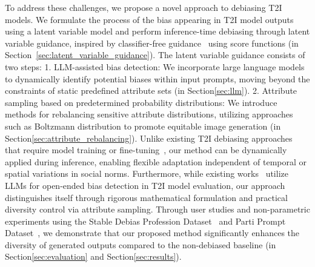 To address these challenges, we propose a novel approach to debiasing T2I models. We formulate the process of the bias appearing in T2I model outputs using a latent variable model and perform inference-time debiasing through latent variable guidance, inspired by classifier-free guidance~\cite{ho2022classifier} using score functions (in Section~\ref{sec:latent_variable_guidance}). The latent variable guidance consists of two steps: 1. LLM-assisted bias detection: We incorporate large language models to dynamically identify potential biases within input prompts, moving beyond the constraints of static predefined attribute sets (in Section\ref{sec:llm}). 2. Attribute sampling based on predetermined probability distributions: We introduce methods for rebalancing sensitive attribute distributions, utilizing approaches such as Boltzmann distribution to promote equitable image generation (in Section\ref{sec:attribute_rebalancing}).
Unlike existing T2I debiasing approaches that require model training or fine-tuning~\cite{Kim_2024,zhang2023iti}, our method can be dynamically applied during inference, enabling flexible adaptation independent of temporal or spatial variations in social norms. Furthermore, while existing works~\cite{D'Incà_2024,Chinchure_2023} utilize LLMs for open-ended bias detection in T2I model evaluation, our approach distinguishes itself through rigorous mathematical formulation and practical diversity control via attribute sampling.
Through user studies and non-parametric experiments using the Stable Debias Profession Dataset~\cite{Luccioni_2023} and Parti Prompt Dataset~\cite{yu2022scaling}, we demonstrate that our proposed method significantly enhances the diversity of generated outputs compared to the non-debiased baseline (in Section\ref{sec:evaluation} and Section\ref{sec:results}).